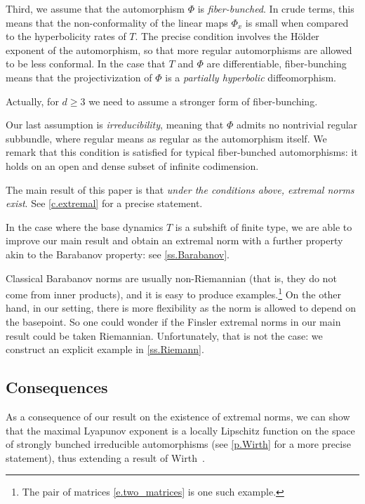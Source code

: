 \documentclass[10pt]{amsart}
\theoremstyle{plain}
\theoremstyle{definition}
\begin{document}
Third, we assume that the automorphism $\Phi$ is \emph{fiber-bunched}.
In crude terms, this means that the non-conformality of the linear maps $\Phi_x$ is small when compared to the hyperbolicity rates of $T$. The precise condition involves the Hölder exponent of the automorphism, so that more regular automorphisms are allowed to be less conformal. In the case that $T$ and $\Phi$ are differentiable, fiber-bunching means that the projectivization of $\Phi$ is a \emph{partially hyperbolic} diffeomorphism.

Actually, for $d \ge 3$ we need to assume a stronger form of fiber-bunching.

Our last assumption is \emph{irreducibility}, meaning that $\Phi$ admits no nontrivial regular subbundle, where regular means as regular as the automorphism itself.
We remark that this condition is satisfied for typical fiber-bunched automorphisms: it holds on an open and dense subset of infinite codimension.

The main result of this paper is that \emph{under the conditions above, extremal norms exist}. See \cref{c.extremal} for a precise statement.

In the case where the base dynamics $T$ is a subshift of finite type, we are able to improve our main result and obtain an extremal norm with a further property akin to the Barabanov property: see \cref{ss.Barabanov}.

Classical Barabanov norms are usually non-Riemannian (that is, they do not come from inner products), and it is easy to produce examples.\footnote{The pair of matrices \eqref{e.two_matrices} is one such example.} On the other hand, in our setting, there is more flexibility as the norm is allowed to depend on the basepoint. So one could wonder if the Finsler extremal norms in our main result could be taken Riemannian. Unfortunately, that is not the case: we construct an explicit example in \cref{ss.Riemann}.

\subsection{Consequences}

As a consequence of our result on the existence of extremal norms, we can show that the maximal Lyapunov exponent is a locally Lipschitz function on the space of strongly bunched irreducible automorphisms (see \cref{p.Wirth} for a more precise statement), thus extending a result of Wirth~\cite{Wirth}.
\end{document}
